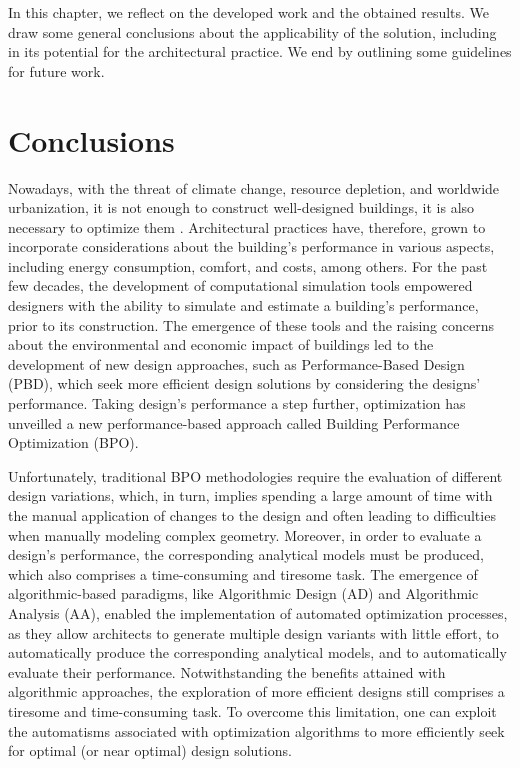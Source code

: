 \label{chap:conclusion}

In this chapter, we reflect on the developed work and the obtained results. We draw some general conclusions about the applicability of the solution, including in its potential for the architectural practice. We end by outlining some guidelines for future work. 

\section{Conclusions}
Nowadays, with the threat of climate change, resource depletion, and worldwide urbanization, it is not enough to construct well-designed buildings, it is also necessary to optimize them \cite{Wortmann2015AdvSBO}. Architectural practices have, therefore, grown to incorporate considerations about the building's performance in various aspects, including energy consumption, comfort, and costs, among others. For the past few decades, the development of computational simulation tools empowered designers with the ability to simulate and estimate a building’s performance, prior to its construction. The emergence of these tools and the raising concerns about the environmental and economic impact of buildings led to the development of new design approaches, such as Performance-Based Design (\ac{PBD}), which seek more efficient design solutions by considering the designs’ performance. Taking design’s performance a step further, optimization has unveilled a new performance-based approach called Building Performance Optimization (\ac{BPO}). 

Unfortunately, traditional \ac{BPO} methodologies require the evaluation of different design variations, which, in turn, implies spending a large amount of time with the manual application of changes to the design and often leading to difficulties when manually modeling complex geometry. Moreover, in order to evaluate a design's performance, the corresponding analytical models must be produced, which also comprises a time-consuming and tiresome task. The emergence of algorithmic-based paradigms, like Algorithmic Design (\ac{AD}) and Algorithmic Analysis (\ac{AA}), enabled the implementation of automated optimization processes, as they allow architects to generate multiple design variants with little effort, to automatically produce the corresponding analytical models, and to automatically evaluate their performance. Notwithstanding the benefits attained with algorithmic approaches, the exploration of more efficient designs still comprises a tiresome and time-consuming task. To overcome this limitation, one can exploit the automatisms associated with optimization algorithms to more efficiently seek for optimal (or near optimal) design solutions.

